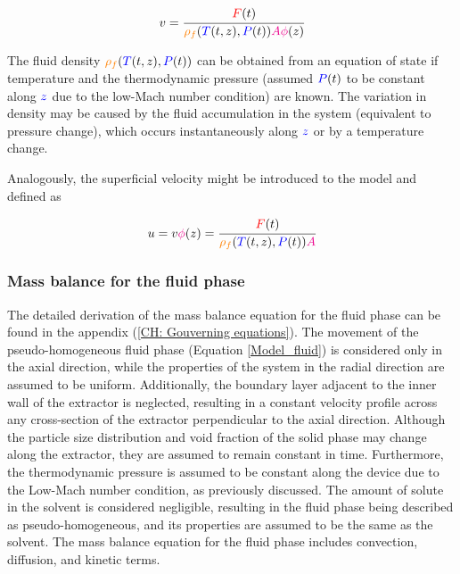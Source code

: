 \documentclass[../Article_Model_Parameters.tex]{subfiles}
\begin{document}
	{\footnotesize
	\begin{equation}
		v = \cfrac{{\color{red}F}(t)}{{\color{orange}\rho_f}({\color{blue}T}(t,z),{\color{blue}P}(t)) {\color{magenta}A\phi}(z)} 
	\end{equation}
	}
	
	The fluid density ${\color{orange}\rho_f}({\color{blue}T}(t,z),{\color{blue}P}(t))$ can be obtained from an equation of state if temperature and the thermodynamic pressure (assumed ${\color{blue}P}(t)$ to be constant along ${\color{blue}z}$ due to the low-Mach number condition) are known. The variation in density may be caused by the fluid accumulation in the system (equivalent to pressure change), which occurs instantaneously along ${\color{blue}z}$ or by a temperature change. 
	
	Analogously, the superficial velocity might be introduced to the model and defined as
	
	{\footnotesize
		\begin{equation}
			u = v {\color{magenta}\phi}(z) = \cfrac{{\color{red}F}(t)}{{\color{orange}\rho_f}({\color{blue}T}(t,z),{\color{blue}P}(t)) {\color{magenta} A} }
		\end{equation}
	}
	
	\subsubsection{Mass balance for the fluid phase} \label{CH: Mass_balance_fluid}
	
	The detailed derivation of the mass balance equation for the fluid phase can be found in the appendix (\ref{CH: Gouverning equations}). The movement of the pseudo-homogeneous fluid phase (Equation \ref{Model_fluid}) is considered only in the axial direction, while the properties of the system in the radial direction are assumed to be uniform. Additionally, the boundary layer adjacent to the inner wall of the extractor is neglected, resulting in a constant velocity profile across any cross-section of the extractor perpendicular to the axial direction. Although the particle size distribution and void fraction of the solid phase may change along the extractor, they are assumed to remain constant in time. Furthermore, the thermodynamic pressure is assumed to be constant along the device due to the Low-Mach number condition, as previously discussed. The amount of solute in the solvent is considered negligible, resulting in the fluid phase being described as pseudo-homogeneous, and its properties are assumed to be the same as the solvent. The mass balance equation for the fluid phase includes convection, diffusion, and kinetic terms.
	
\end{document}
